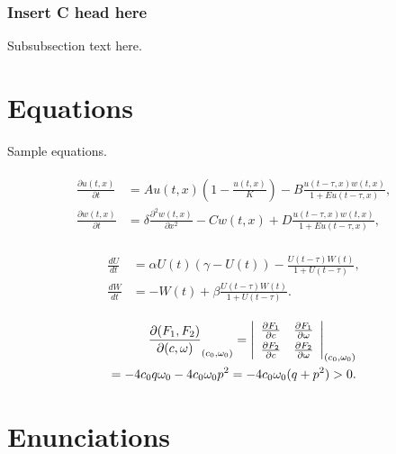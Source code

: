 \documentclass[openacc]{rsproca_new}%
\begin{document}
\subsubsection{Insert C head here}
Subsubsection text here.

\section{Equations}

Sample equations.

\begin{align}\label{1.1}
\begin{split}
\frac{\partial u(t,x)}{\partial t} &= Au(t,x) \left(1-\frac{u(t,x)}{K}\right)-B\frac{u(t-\tau,x) w(t,x)}{1+Eu(t-\tau,x)},\\
\frac{\partial w(t,x)}{\partial t} &=\delta \frac{\partial^2w(t,x)}{\partial x^2}-Cw(t,x)+D\frac{u(t-\tau,x)w(t,x)}{1+Eu(t-\tau,x)},
\end{split}
\end{align}

\begin{align}\label{1.2}
\begin{split}
\frac{dU}{dt} &=\alpha U(t)(\gamma -U(t))-\frac{U(t-\tau)W(t)}{1+U(t-\tau)},\\
\frac{dW}{dt} &=-W(t)+\beta\frac{U(t-\tau)W(t)}{1+U(t-\tau)}.
\end{split}
\end{align}

\begin{eqnarray}
\frac{\partial(F_1,F_2)}{\partial(c,\omega)}_{(c_0,\omega_0)} = \left|
\begin{array}{ll}
\frac{\partial F_1}{\partial c} &\frac{\partial F_1}{\partial \omega} \\\noalign{\vskip3pt}
\frac{\partial F_2}{\partial c}&\frac{\partial F_2}{\partial \omega}
\end{array}\right|_{(c_0,\omega_0)}\notag\\
=-4c_0q\omega_0 -4c_0\omega_0p^2 =-4c_0\omega_0(q+p^2)>0.
\end{eqnarray}


\maketitle

\section{Enunciations}
\end{document}
